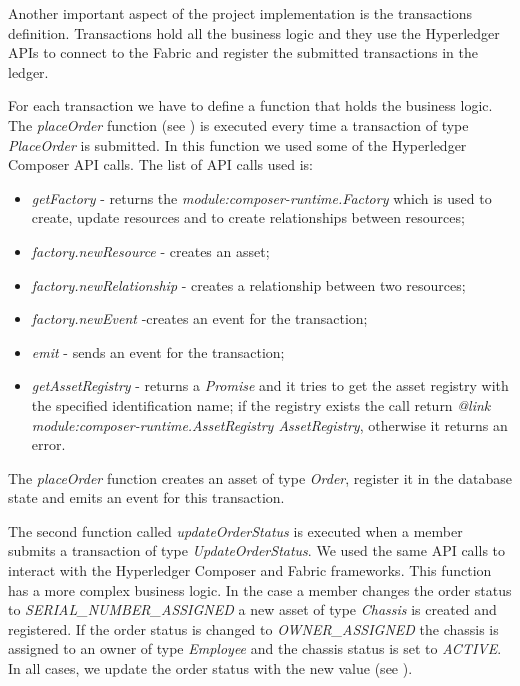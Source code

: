Another important aspect of the project implementation is the transactions definition. Transactions hold all the business logic and they use the Hyperledger APIs to connect to the Fabric and register the submitted transactions in the ledger.

For each transaction we have to define a function that holds the business logic.
The \emph{placeOrder} function (see ) is executed every time a transaction of type \emph{PlaceOrder} is submitted. In this function we used some of the Hyperledger Composer API calls.
The list of API calls used is:
\begin{itemize}
	\item \emph{getFactory} - returns the \emph{module:composer-runtime.Factory} which is used to create, update resources and to create relationships between resources;
	\item \emph{factory.newResource} - creates an asset;
	\item \emph{factory.newRelationship} - creates a relationship between two resources;
	\item \emph{factory.newEvent} -creates an event for the transaction;
	\item \emph{emit} - sends an event for the transaction;
	\item \emph{getAssetRegistry} - returns a \emph{Promise} and it tries to get the asset registry with the specified identification name; if the registry exists the call return \emph{@link module:composer-runtime.AssetRegistry AssetRegistry}, otherwise it returns an error.
\end{itemize}
The \emph{placeOrder} function creates an asset of type \emph{Order}, register it in the database state and emits an event for this transaction.

The second function called \emph{updateOrderStatus} is executed when a member submits a transaction of type \emph{UpdateOrderStatus}. We used the same API calls to interact with the Hyperledger Composer and Fabric frameworks. This function has a more complex business logic. In the case a member changes the order status to \emph{SERIAL_NUMBER_ASSIGNED} a new asset of type \emph{Chassis} is created and registered. If the order status is changed to \emph{OWNER_ASSIGNED} the chassis is assigned to an owner of type \emph{Employee} and the chassis status is set to \emph{ACTIVE}. In all cases, we update the order status with the new value (see ).



